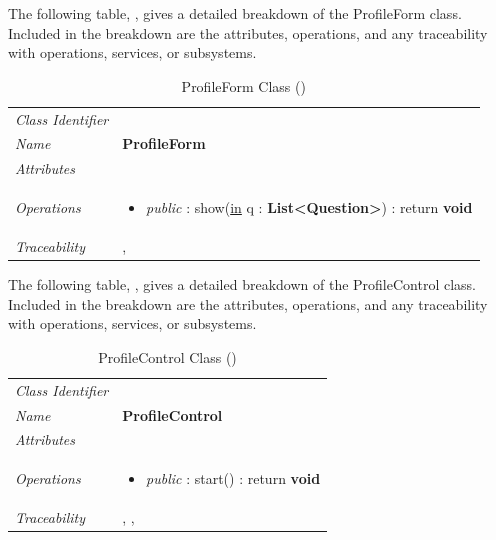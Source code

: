 \documentclass[12pt,letterpaper]{article}
\begin{document}
The following table, , gives a detailed breakdown of the ProfileForm class. Included in the breakdown are the attributes, operations, and any traceability with operations, services, or subsystems.

\begin{table}[H]
    \caption{ProfileForm Class ()} 
	\begin{tabu} to 
		\toprule
		Class Identifier &  \\
		Name & {\bf ProfileForm} \\
		Attributes & \\

		Operations &
		\begin{minipage}[t]{\linewidth}
			\begin{itemize}
			    \item {\it public} : show(\underline{in} q : {\bf List<Question>}) : return {\bf void}
	        \end{itemize}
	    \end{minipage} \\
	    	Traceability & , \\
		\toprule
	\end{tabu}
\end{table}

The following table, , gives a detailed breakdown of the ProfileControl class. Included in the breakdown are the attributes, operations, and any traceability with operations, services, or subsystems.

\begin{table}[H]
    \caption{ProfileControl Class ()} 
	\begin{tabu} to 
		\toprule
		Class Identifier &  \\
		Name & {\bf ProfileControl} \\
		Attributes & \\

		Operations &
		\begin{minipage}[t]{\linewidth}
			\begin{itemize}
			    \item {\it public} : start() : return {\bf void}
	        \end{itemize}
	    \end{minipage} \\
	    	Traceability & , , \\
		\toprule
	\end{tabu}
\end{table}
\end{document}
